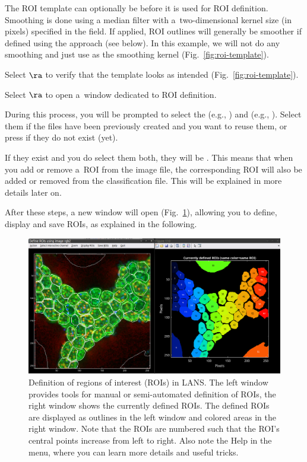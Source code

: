 \bul The ROI template can optionally be  before it is used for ROI definition. Smoothing is done using a median filter with a~two-dimensional kernel size (in pixels) specified in the  field. If applied, ROI outlines will generally be smoother if defined using the  approach (see below). In this example, we will not do any smoothing and just use \ttt{[1 1]} as the smoothing kernel (Fig.~\ref{fig:roi-template}).

\s Select  $\ra$  to verify that the template looks as intended (Fig.~\ref{fig:roi-template}). 

\s Select  $\ra$  to open a~window dedicated to ROI definition. 

\bul During this process, you will be prompted to select the  (e.g., ) and  (e.g., ). Select them if the files have been previously created and you want to reuse them, or press  if they do not exist (yet).

\bul If they exist and you do select them both, they will be . This means that when you add or remove a~ROI from the image file, the corresponding ROI will also be added or removed from the classification file. This will be explained in more details later on.

\vskip5mm\noindent
After these steps, a new window will open (Fig.~\ref{fig:roi-definition-tool}), allowing you to define, display and save ROIs, as explained in the following.

\begin{figure}[!ht]
\centering
\includegraphics[width=\textwidth]{figs3/LANS-roi-definition-tool}
\caption{\label{fig:roi-definition-tool}%
Definition of regions of interest (ROIs) in LANS. The left window provides tools for manual or semi-automated definition of ROIs, the right window shows the currently defined ROIs. The defined ROIs are displayed as outlines in the left window and colored areas in the right window. Note that the ROIs are numbered such that the ROI's central points increase from left to right. Also note the Help in the menu, where you can learn more details and useful tricks.}
\end{figure}

